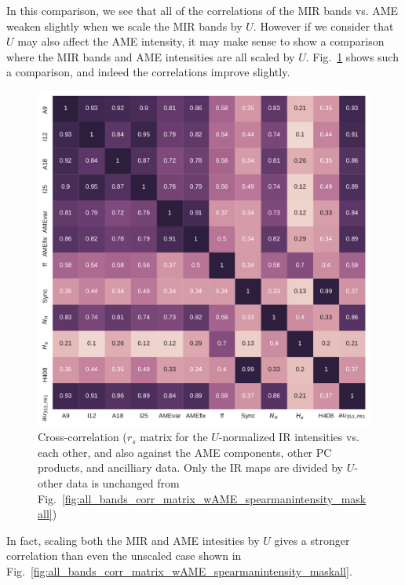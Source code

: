             In this comparison, we see that all of the correlations of the MIR bands vs. AME weaken slightly when we scale the MIR bands by $U$. However if we consider that $U$ may also affect the AME intensity, it may make sense to show a comparison where the MIR bands and AME intensities are all scaled by $U$. Fig.~\ref{fig:all_bands_corr_matrix_wAME_spearmanU_norm_AMEnorm_masked} shows such a comparison, and indeed the correlations improve slightly.
                \begin{figure}
                    \includegraphics[width=\textwidth/2]{../Plots/ch_allsky/all_bands_corr_matrix_wAME_spearmanU_norm_AMEnorm_masked.pdf}
                    \centering
                    \caption{Cross-correlation ($r_{s}$ matrix for the $U$-normalized IR intensities vs. each other, and also against the AME components, other PC products, and ancilliary data. Only the IR maps are divided by $U$- other data is unchanged from Fig.~\ref{fig:all_bands_corr_matrix_wAME_spearmanintensity_maskall})}
                    \label{fig:all_bands_corr_matrix_wAME_spearmanU_norm_AMEnorm_masked}
                \end{figure}
            In fact, scaling both the MIR and AME intesities by $U$ gives a stronger correlation than even the unscaled case shown in Fig.~\ref{fig:all_bands_corr_matrix_wAME_spearmanintensity_maskall}.



